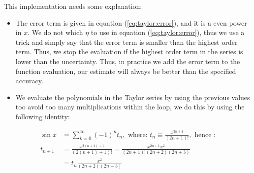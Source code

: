 \documentclass[graybox,sectrefs,envcountresetchap,open=right,final]{svmonodo}
\begin{document}
This implementation needs some explanation:

\begin{itemize}
\item The error term is given in equation (\ref{eq:taylor:error}), and it is a even power in $x$. We do not which $\eta$ to use in equation (\ref{eq:taylor:error}), thus we use a trick and simply say that the error term is smaller than the highest order term. Thus, we stop the evaluation if the highest order term in the series is lower than the uncertainty. Thus, in practice we add the error term to the function evaluation, our estimate will always be better than the specified accuracy.

\item We evaluate the polynomials in the Taylor series by using the previous values too avoid too many multiplications within the loop, we do this by using the following identity:
\end{itemize}

\noindent
  \begin{align}
  \sin x&=\sum_{k=0}^{\infty} (-1)^nt_n, \text{ where: } t_n\equiv\frac{x^{2n+1}}{(2n+1)!}, \text{ hence :}\nonumber\\ 
  t_{n+1}&=\frac{x^{2(n+1)+1}}{(2(n+1)+1)!}=\frac{x^{2n+1}x^2}{(2n+1)! (2n+2)(2n+3)}\nonumber\\ 
  &=t_n\frac{x^2}{(2n+2)(2n+3)}
  \end{align}
\end{document}
